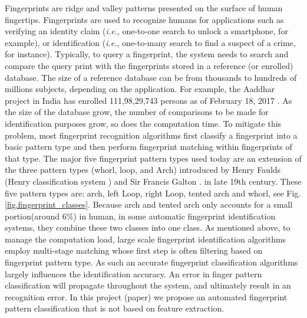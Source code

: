 

Fingerprints are ridge and valley patterns presented on the surface of human fingertips.
%
Fingerprints are used to recognize humans for applications such as verifying an identity claim (\textit{i.e.}, one-to-one search to  unlock a smartphone, for example), or identification (\textit{i.e.}, one-to-many search to find a suspect of a crime, for instance).
%
Typically, to query a fingerprint, the system needs to search and compare the query print with the fingerprints stored in a reference (or enrolled) database.  The size of a reference database can be from thousands to hundreds of millions subjects, depending on the application. For example, the Aaddhar project in India has enrolled 111,98,29,743 persons as of February 18, 2017 \cite{aaddhaar}.  
%
As the size of the database grow, the number of comparisons to be made for identification purposes grow, so does the computation time.
%
To mitigate this problem, most fingerprint recognition algorithms first classify a fingerprint into a basic pattern type and then perform fingerprint matching within fingerprints of that type.
%
The major five fingerprint pattern types used today are an extension of the three pattern types (whorl, loop, and Arch) introduced by Henry Faulds (Henry classification system \cite{henry1905classification}) and Sir Francis Galton \cite{galton1892}. in late 19th century. These five pattern types are: arch, left Loop, right Loop, tented arch and whorl, see Fig.\ref{fig.fingerprint_classes}.  
%
Because arch and tented arch only accounts for a small portion(around 6\%) in human, in some automatic fingerprint identification systems, they combine these two classes into one class. 
%
As mentioned above, to manage the computation load, large scale fingerprint identification algorithms employ multi-stage matching whose first step is often filtering based on fingerprint pattern type. As such an accurate fingerprint classification algorithms largely influences the identification accuracy. An error in finger pattern classification will propagate throughout the system, and ultimately result in an recognition error. In this project (paper) we propose an automated fingerprint pattern classification that is not based on feature extraction.

